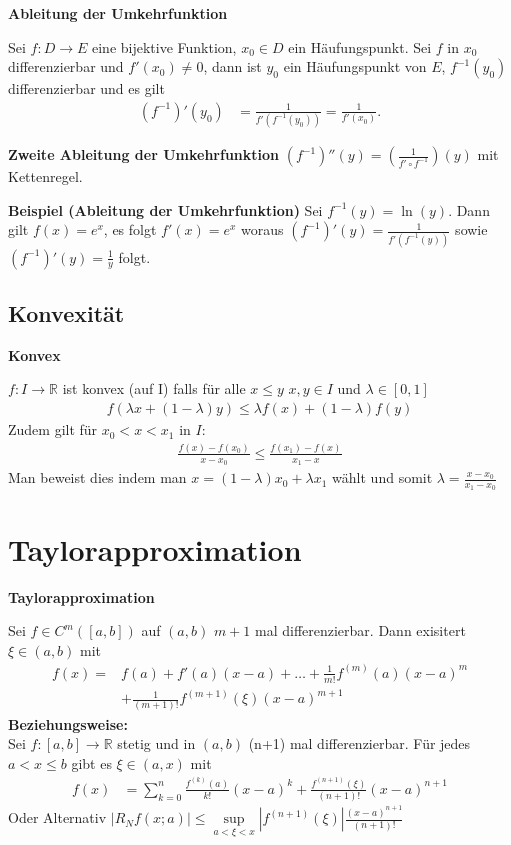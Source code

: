 \documentclass[25pt]{sciposter}
\newcommand{\R}{\mathbb{R}}
\newenvironment{method}[1]{\begin{mdframed}[backgroundcolor=blue!10,innertopmargin=15pt, innerbottommargin=15pt, nobreak=true]
		\textbf{#1 }
	}
	{ 
	\end{mdframed}
}
\begin{document}
\begin{multicols}{3}
\begin{method}{Ableitung der Umkehrfunktion}
	Sei $f: D \to E$ eine bijektive Funktion, $x_0 \in D$ ein Häufungspunkt. Sei $f$ in $x_0$ differenzierbar und $f'(x_0) \not = 0$, dann ist $y_0$ ein Häufungspunkt von $E$, $f^{-1}(y_0)$ differenzierbar und es gilt
	\begin{align*}
		(f^{{-1}})'(y_0) &= {\frac  {1}{f'(f^{{-1}}(y_0))}}={\frac  {1}{f'(x_0)}}.
	\end{align*}
\end{method}

\textbf{Zweite Ableitung der Umkehrfunktion} $(f^{-1})''(y) = \left(\frac{1}{f' \circ f^{-1}}\right)(y)$ mit Kettenregel.  


\textbf{Beispiel (Ableitung der Umkehrfunktion)} Sei $f^{-1}(y) = \ln(y)$. Dann gilt $f(x) = e^x$, es folgt $f'(x)= e^x$ woraus $(f^{-1})'(y) = \frac{1}{f'(f^{-1}(y))}$ sowie $(f^{-1})'(y) = \frac{1}{y}$ folgt. 


\subsection*{Konvexität}

\begin{method}{Konvex}
	$f : I \to \R$ ist konvex (auf I) falls für alle $x \leq y$ $x,y \in I$ und $\lambda \in [0,1]$
	\begin{align*}
	f(\lambda x + (1-\lambda)y) \leq \lambda f(x) + (1-\lambda)f(y)
	\end{align*}
	Zudem gilt für $x_0 < x< x_1$ in $I$:
	\begin{align*}
	 \frac{f(x) - f(x_0)}{x-x_0} \leq \frac{f(x_1) - f(x)}{x_1 - x}
	\end{align*}
	Man beweist dies indem man $x = (1-\lambda) x_0 + \lambda x_1$ wählt und somit $\lambda = \frac{x-x_0}{x_1 - x_0}$
\end{method}

\section*{Taylorapproximation}

\begin{method}{Taylorapproximation}
Sei $f\in C^m ([a,b])$ auf $(a,b)$ $m+1$ mal differenzierbar. Dann exisitert $\xi \in (a,b)$ mit 
\begin{align*}
	f(x) =& f(a) + f'(a)(x-a) + \ldots + \frac{1}{m!} f^{(m)} (a) (x-a)^m\\ &+ \frac{1}{(m+1)!} f^{(m+1)}(\xi) (x-a)^{m+1}
\end{align*} 
 \textbf{Beziehungsweise:}\\
	Sei $f:[a,b] \to \R$ stetig und in $(a,b)$ (n+1) mal differenzierbar. Für jedes $a<x\leq b$ gibt es $\xi \in (a,x)$ mit
	\begin{align*}
	f(x) &= \sum_{k=0}^n \frac{f^{(k)}(a)}{k!} (x-a)^k + \frac{f^{(n+1)}(\xi)}{(n+1)!} (x-a)^{n+1}
	\end{align*}
Oder Alternativ $|R_N f(x;a)| \leq \sup\limits_{a < \xi < x} |f^{(n+1)} (\xi)|  \frac{(x-a)^{n+1}}{(n+1)!}$
\end{method}


\end{multicols}
\end{document}
